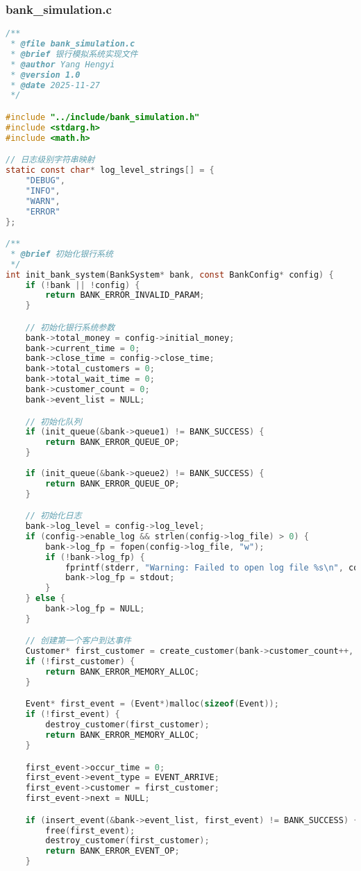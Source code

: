 \documentclass[12pt,a4paper]{article}
\begin{document}
\subsubsection{bank\_simulation.c}
\begin{lstlisting}[language=C,caption=bank\_simulation.c]
/**
 * @file bank_simulation.c
 * @brief 银行模拟系统实现文件
 * @author Yang Hengyi
 * @version 1.0
 * @date 2025-11-27
 */

#include "../include/bank_simulation.h"
#include <stdarg.h>
#include <math.h>

// 日志级别字符串映射
static const char* log_level_strings[] = {
    "DEBUG",
    "INFO",
    "WARN",
    "ERROR"
};

/**
 * @brief 初始化银行系统
 */
int init_bank_system(BankSystem* bank, const BankConfig* config) {
    if (!bank || !config) {
        return BANK_ERROR_INVALID_PARAM;
    }

    // 初始化银行系统参数
    bank->total_money = config->initial_money;
    bank->current_time = 0;
    bank->close_time = config->close_time;
    bank->total_customers = 0;
    bank->total_wait_time = 0;
    bank->customer_count = 0;
    bank->event_list = NULL;

    // 初始化队列
    if (init_queue(&bank->queue1) != BANK_SUCCESS) {
        return BANK_ERROR_QUEUE_OP;
    }
    
    if (init_queue(&bank->queue2) != BANK_SUCCESS) {
        return BANK_ERROR_QUEUE_OP;
    }

    // 初始化日志
    bank->log_level = config->log_level;
    if (config->enable_log && strlen(config->log_file) > 0) {
        bank->log_fp = fopen(config->log_file, "w");
        if (!bank->log_fp) {
            fprintf(stderr, "Warning: Failed to open log file %s\n", config->log_file);
            bank->log_fp = stdout;
        }
    } else {
        bank->log_fp = NULL;
    }

    // 创建第一个客户到达事件
    Customer* first_customer = create_customer(bank->customer_count++, 0);
    if (!first_customer) {
        return BANK_ERROR_MEMORY_ALLOC;
    }

    Event* first_event = (Event*)malloc(sizeof(Event));
    if (!first_event) {
        destroy_customer(first_customer);
        return BANK_ERROR_MEMORY_ALLOC;
    }

    first_event->occur_time = 0;
    first_event->event_type = EVENT_ARRIVE;
    first_event->customer = first_customer;
    first_event->next = NULL;

    if (insert_event(&bank->event_list, first_event) != BANK_SUCCESS) {
        free(first_event);
        destroy_customer(first_customer);
        return BANK_ERROR_EVENT_OP;
    }


\end{lstlisting}
\end{document}
